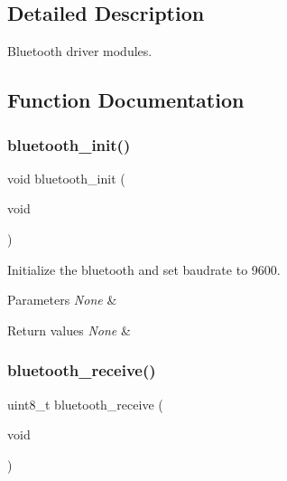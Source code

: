 \subsection{Detailed Description}
Bluetooth driver modules. 



\subsection{Function Documentation}
\mbox{\label{group___bluetooth_gaaa60810e0857e9e1e5b2cba80b8db3ff}} 
\subsubsection{\texorpdfstring{bluetooth\+\_\+init()}{bluetooth\_init()}}
{\footnotesize\ttfamily void bluetooth\+\_\+init (\begin{DoxyParamCaption}\item[{void}]{ }\end{DoxyParamCaption})}



Initialize the bluetooth and set baudrate to 9600. 


\begin{DoxyParams}{Parameters}
{\em None} & \\
\hline
\end{DoxyParams}

\begin{DoxyRetVals}{Return values}
{\em None} & \\
\hline
\end{DoxyRetVals}
\mbox{\label{group___bluetooth_gab7ad1e1b94cf1cedc8a8e5151b0e25cb}} 
\subsubsection{\texorpdfstring{bluetooth\+\_\+receive()}{bluetooth\_receive()}}
{\footnotesize\ttfamily uint8\+\_\+t bluetooth\+\_\+receive (\begin{DoxyParamCaption}\item[{void}]{ }\end{DoxyParamCaption})}




